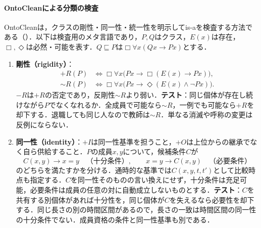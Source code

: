 \documentclass[../../main-detail.tex]{subfiles}
\begin{document}
\paragraph{OntoCleanによる分類の検査}
OntoCleanは，クラスの剛性・同一性・統一性を明示してis-aを検査する方法である（\citet{guarino2009ontoclean}）．以下は検査用のメタ言語であり，$P,Q$はクラス，$E(x)$は存在，$\Box,\Diamond$は必然・可能を表す．$Q\sqsubseteq P$は$\Box\forall x(Qx\to Px)$とする．
\begin{enumerate}
    \item \textbf{剛性（rigidity）}：
    \[
    \begin{aligned}
        +R(P)&\iff\Box\forall x\bigl(Px\to\Box(E(x)\to Px)\bigr),\\
        {\sim}R(P)&\iff\Box\forall x\bigl(Px\to\Diamond(E(x)\land\neg Px)\bigr).
    \end{aligned}
    \]
    $-R$は$+R$の否定であり，反剛性${\sim}R$より弱い．\textbf{テスト}：同じ個体が存在し続けながら$P$でなくなれるか．全成員で可能なら${\sim}R$，一例でも可能なら$+R$を却下する．退職しても同じ人なので教師は${\sim}R$．単なる消滅や呼称の変更は反例にならない．

    \item \textbf{同一性（identity）}：$+I$は同一性基準を担うこと，$+O$は上位からの継承でなく自ら供給すること．$P$の成員$x,y$について，候補条件$C$が
    \[
        C(x,y)\to x=y\quad\text{（十分条件）},\qquad
        x=y\to C(x,y)\quad\text{（必要条件）}
    \]
    のどちらを満たすかを分ける．通時的な基準では$C(x,y,t,t')$として比較時点も指定する．$C$を同一性そのものの言い換えにせず，十分条件は充足可能，必要条件は成員の任意の対に自動成立しないものとする．\textbf{テスト}：$C$を共有する別個体があれば十分性を，同じ個体が$C$を失えるなら必要性を却下する．同じ長さの別の時間区間があるので，長さの一致は時間区間の同一性の十分条件でない．成員資格の条件と同一性基準も別である．


\end{enumerate}
\end{document}
